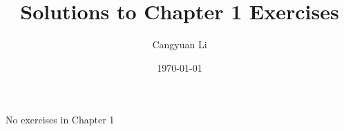 \documentclass[14pt]{extreport}
\title{Solutions to Chapter 1 Exercises}
\author{Cangyuan Li}
\date{\today}
\begin{document}
\maketitle

No exercises in Chapter 1
\end{document}
